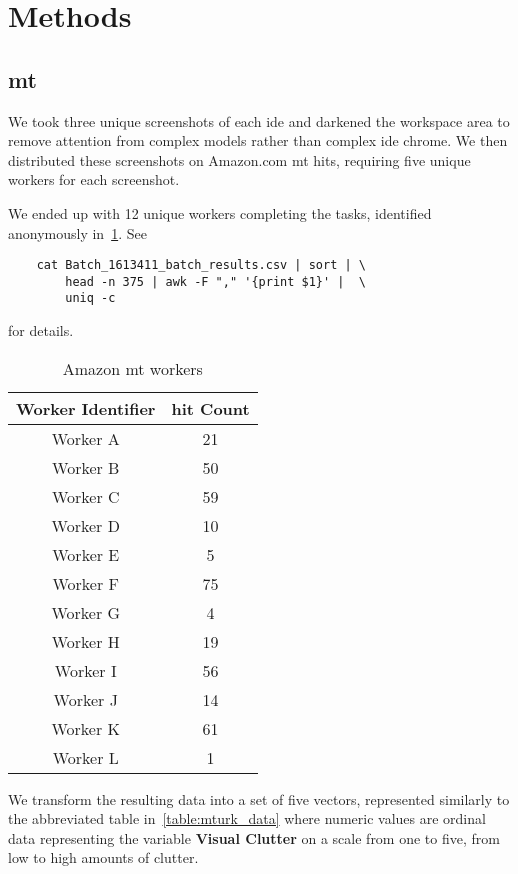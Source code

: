 \section{Methods}
\label{sec:methods}

\subsection{\acl{mt}}
We took three unique screenshots of each \ac{ide} and darkened the
workspace area to remove attention from complex models rather than complex
\ac{ide} chrome. We then distributed these screenshots on Amazon.com
\ac{mt} \acp{hit}, requiring five unique workers for each
screenshot.

We ended up with 12 unique workers completing the tasks, identified
anonymously in~\ref{table:mturk_workers}.  See
\begin{verbatim}    cat Batch_1613411_batch_results.csv | sort | \
        head -n 375 | awk -F "," '{print $1}' |  \
        uniq -c\end{verbatim}
for details.

\noindent
\begin{table}[!htb]\centering
{}
\label{table:mturk_workers}
\begin{tabular}{@{}cc@{}}\toprule
  \textbf{Worker Identifier} & \textbf{\ac{hit} Count} \\
  \midrule
  Worker A & 21 \\
  Worker B & 50 \\
  Worker C & 59 \\
  Worker D & 10 \\
  Worker E & 5 \\
  Worker F & 75 \\
  Worker G & 4 \\
  Worker H & 19 \\
  Worker I & 56 \\
  Worker J & 14 \\
  Worker K & 61 \\
  Worker L & 1 \\
  \bottomrule
\end{tabular}
\caption{Amazon \acs{mt} workers}
\end{table}

We transform the resulting data into a set of five vectors, represented
similarly to the abbreviated table in~\ref{table:mturk_data} where numeric
values are ordinal data representing the variable \textbf{Visual Clutter}
on a scale from one to five, from low to high amounts of clutter.


